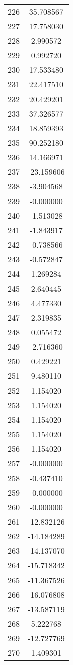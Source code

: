 \documentclass[12pt]{article}
\begin{document}
\begin{longtable}{@{}cc@{}}
226 & 35.708567 \\
227 & 17.758030 \\
228 & 2.990572 \\
229 & 0.992720 \\
230 & 17.533480 \\
231 & 22.417510 \\
232 & 20.429201 \\
233 & 37.326577 \\
234 & 18.859393 \\
235 & 90.252180 \\
236 & 14.166971 \\
237 & -23.159606 \\
238 & -3.904568 \\
239 & -0.000000 \\
240 & -1.513028 \\
241 & -1.843917 \\
242 & -0.738566 \\
243 & -0.572847 \\
244 & 1.269284 \\
245 & 2.640445 \\
246 & 4.477330 \\
247 & 2.319835 \\
248 & 0.055472 \\
249 & -2.716360 \\
250 & 0.429221 \\
251 & 9.480110 \\
252 & 1.154020 \\
253 & 1.154020 \\
254 & 1.154020 \\
255 & 1.154020 \\
256 & 1.154020 \\
257 & -0.000000 \\
258 & -0.437410 \\
259 & -0.000000 \\
260 & -0.000000 \\
261 & -12.832126 \\
262 & -14.184289 \\
263 & -14.137070 \\
264 & -15.718342 \\
265 & -11.367526 \\
266 & -16.076808 \\
267 & -13.587119 \\
268 & 5.222768 \\
269 & -12.727769 \\
270 & 1.409301 \\

\end{longtable}
\end{document}
